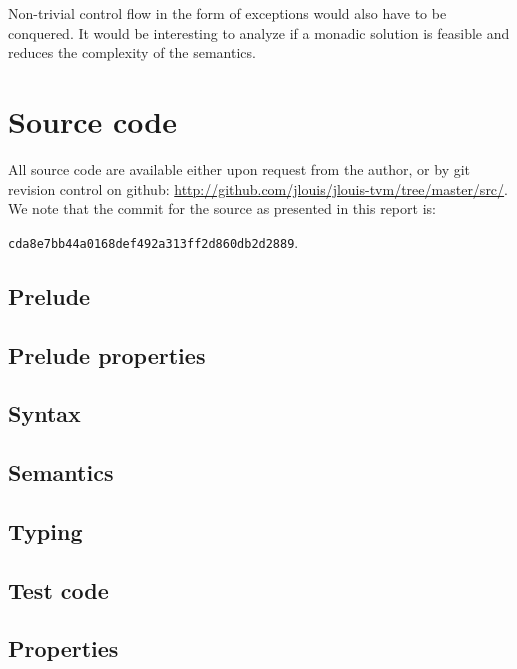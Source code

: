 \documentclass[a4paper, oneside, 10pt, draft]{memoir}
\begin{document}
Non-trivial control flow in the form of exceptions would also have to
be conquered. It would be interesting to analyze if a monadic solution
is feasible and reduces the complexity of the semantics.



\appendix
\chapter{Source code}
All source code are available either upon request from the author, or
by git revision control on github:
\url{http://github.com/jlouis/jlouis-tvm/tree/master/src/}. We note
that the commit for the source as presented in this report
is:
\begin{center}
  \texttt{cda8e7bb44a0168def492a313ff2d860db2d2889}.
\end{center}

\section{Prelude}
{\footnotesize

}
\section{Prelude properties}
{\footnotesize

}
\section{Syntax}
{\footnotesize

}
\section{Semantics}
{\footnotesize

}
\section{Typing}
{\footnotesize

}
\section{Test code}
{\footnotesize

}
\section{Properties}
{\footnotesize

}
\end{document}
